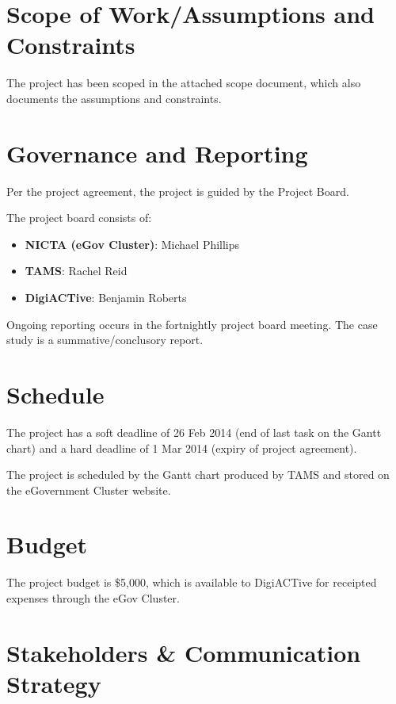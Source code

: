 \documentclass[12pt,a4paper,twosided]{article}
\begin{document}
\section{Scope of Work/Assumptions and Constraints}

The project has been scoped in the attached scope document, which also
documents the assumptions and constraints.

\section{Governance and Reporting}

Per the project agreement, the project is guided by the Project Board.

The project board consists of:

\begin{itemize}
\itemsep1pt\parskip0pt
\item
  \textbf{NICTA (eGov Cluster)}: Michael Phillips
\item
  \textbf{TAMS}: Rachel Reid
\item
  \textbf{DigiACTive}: Benjamin Roberts
\end{itemize}

Ongoing reporting occurs in the fortnightly project board meeting. The
case study is a summative/conclusory report.

\section{Schedule}

The project has a soft deadline of 26 Feb 2014 (end of last task on the
Gantt chart) and a hard deadline of 1 Mar 2014 (expiry of project
agreement).

The project is scheduled by the Gantt chart produced by TAMS and stored
on the eGovernment Cluster website.

\section{Budget}

The project budget is \$5,000, which is available to DigiACTive for
receipted expenses through the eGov Cluster.

\section{Stakeholders \& Communication Strategy}
\end{document}
